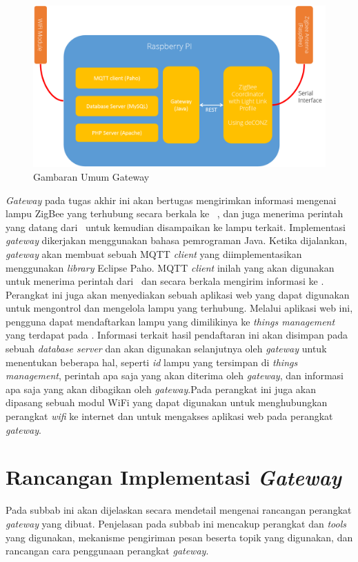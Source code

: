 \begin{figure}
	\centering
	\includegraphics[width=.9\textwidth]{pics/rancangan-gateway.PNG}
	\caption{Gambaran Umum Gateway}
	\label{fig:rancangan-gateway}
\end{figure} 

\textit{Gateway} pada tugas akhir ini akan bertugas mengirimkan informasi mengenai lampu ZigBee yang terhubung secara berkala ke \plat~, dan juga menerima perintah yang datang dari \plat~untuk kemudian disampaikan ke lampu terkait. Implementasi \textit{gateway} dikerjakan menggunakan bahasa pemrograman Java. Ketika dijalankan, \textit{gateway} akan membuat sebuah MQTT \textit{client} yang diimplementasikan menggunakan \textit{library} Eclipse Paho. MQTT \textit{client} inilah yang akan digunakan untuk menerima perintah dari \plat~dan secara berkala mengirim informasi ke \plat. Perangkat ini juga akan menyediakan sebuah aplikasi web yang dapat digunakan untuk mengontrol dan mengelola lampu yang terhubung. Melalui aplikasi web ini, pengguna dapat mendaftarkan lampu yang dimilikinya ke \textit{things management} yang terdapat pada \plat. Informasi terkait hasil pendaftaran ini akan disimpan pada sebuah \textit{database server} dan akan digunakan selanjutnya oleh \textit{gateway} untuk menentukan beberapa hal, seperti \textit{id} lampu yang tersimpan di \textit{things management}, perintah apa saja yang akan diterima oleh \textit{gateway}, dan informasi apa saja yang akan dibagikan oleh \textit{gateway}.Pada perangkat ini juga akan dipasang sebuah modul WiFi yang dapat digunakan untuk menghubungkan perangkat \textit{wifi} ke internet dan untuk mengakses aplikasi web pada perangkat \textit{gateway}.

\section{Rancangan Implementasi \textit{Gateway}}
Pada subbab ini akan dijelaskan secara mendetail mengenai rancangan perangkat \textit{gateway} yang dibuat. Penjelasan pada subbab ini mencakup perangkat dan \textit{tools} yang digunakan, mekanisme pengiriman pesan beserta topik yang digunakan, dan rancangan cara penggunaan perangkat \textit{gateway}.


